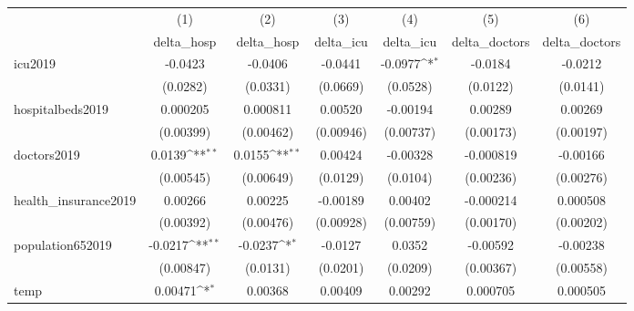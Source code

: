 {
\def\sym#1{\ifmmode^{#1}\else\(^{#1}\)\fi}
\begin{tabular}{l*{6}{c}}
\hline\hline
            &\multicolumn{1}{c}{(1)}&\multicolumn{1}{c}{(2)}&\multicolumn{1}{c}{(3)}&\multicolumn{1}{c}{(4)}&\multicolumn{1}{c}{(5)}&\multicolumn{1}{c}{(6)}\\
            &\multicolumn{1}{c}{delta\_hosp}&\multicolumn{1}{c}{delta\_hosp}&\multicolumn{1}{c}{delta\_icu}&\multicolumn{1}{c}{delta\_icu}&\multicolumn{1}{c}{delta\_doctors}&\multicolumn{1}{c}{delta\_doctors}\\
\hline
icu2019     &     -0.0423         &     -0.0406         &     -0.0441         &     -0.0977\sym{*}  &     -0.0184         &     -0.0212         \\
            &    (0.0282)         &    (0.0331)         &    (0.0669)         &    (0.0528)         &    (0.0122)         &    (0.0141)         \\
[1em]
hospitalbeds2019&    0.000205         &    0.000811         &     0.00520         &    -0.00194         &     0.00289         &     0.00269         \\
            &   (0.00399)         &   (0.00462)         &   (0.00946)         &   (0.00737)         &   (0.00173)         &   (0.00197)         \\
[1em]
doctors2019 &      0.0139\sym{**} &      0.0155\sym{**} &     0.00424         &    -0.00328         &   -0.000819         &    -0.00166         \\
            &   (0.00545)         &   (0.00649)         &    (0.0129)         &    (0.0104)         &   (0.00236)         &   (0.00276)         \\
[1em]
health\_insurance2019&     0.00266         &     0.00225         &    -0.00189         &     0.00402         &   -0.000214         &    0.000508         \\
            &   (0.00392)         &   (0.00476)         &   (0.00928)         &   (0.00759)         &   (0.00170)         &   (0.00202)         \\
[1em]
population652019&     -0.0217\sym{**} &     -0.0237\sym{*}  &     -0.0127         &      0.0352         &    -0.00592         &    -0.00238         \\
            &   (0.00847)         &    (0.0131)         &    (0.0201)         &    (0.0209)         &   (0.00367)         &   (0.00558)         \\
[1em]
temp        &     0.00471\sym{*}  &     0.00368         &     0.00409         &     0.00292         &    0.000705         &    0.000505         \\

\end{tabular}}
